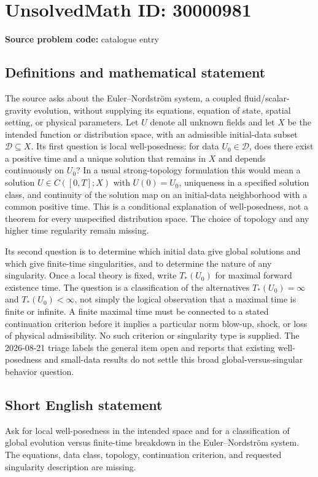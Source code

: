\documentclass[11pt]{article}
\begin{document}
\section*{UnsolvedMath ID: 30000981}
\textbf{Source problem code:} catalogue entry
\subsection{Definitions and mathematical statement}
The source asks about the Euler--Nordstr\"om system, a coupled fluid/scalar-gravity evolution, without supplying its equations, equation of state, spatial setting, or physical parameters. Let $U$ denote all unknown fields and let $X$ be the intended function or distribution space, with an admissible initial-data subset $\mathcal D\subseteq X$. Its first question is local well-posedness: for data $U_0\in\mathcal D$, does there exist a positive time and a unique solution that remains in $X$ and depends continuously on $U_0$? In a usual strong-topology formulation this would mean a solution $U\in C([0,T];X)$ with $U(0)=U_0$, uniqueness in a specified solution class, and continuity of the solution map on an initial-data neighborhood with a common positive time. This is a conditional explanation of well-posedness, not a theorem for every unspecified distribution space. The choice of topology and any higher time regularity remain missing.\par Its second question is to determine which initial data give global solutions and which give finite-time singularities, and to determine the nature of any singularity. Once a local theory is fixed, write $T_*(U_0)$ for maximal forward existence time. The question is a classification of the alternatives $T_*(U_0)=\infty$ and $T_*(U_0)<\infty$, not simply the logical observation that a maximal time is finite or infinite. A finite maximal time must be connected to a stated continuation criterion before it implies a particular norm blow-up, shock, or loss of physical admissibility. No such criterion or singularity type is supplied. The 2026-08-21 triage labels the general item open and reports that existing well-posedness and small-data results do not settle this broad global-versus-singular behavior question.
\subsection{Short English statement}
Ask for local well-posedness in the intended space and for a classification of global evolution versus finite-time breakdown in the Euler--Nordstr\"om system. The equations, data class, topology, continuation criterion, and requested singularity description are missing.
\end{document}
